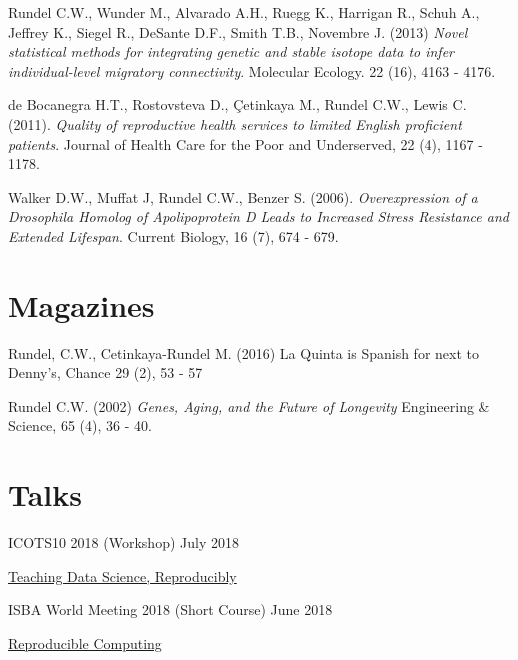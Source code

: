 \documentclass[margin,line]{res}
\begin{document}
\begin{resume}
\vspace{-0.15cm}
Rundel C.W., Wunder M., Alvarado A.H., Ruegg K., Harrigan R., Schuh A., Jeffrey K., Siegel R., DeSante D.F., Smith T.B., Novembre J. (2013) {\em Novel statistical methods for integrating genetic and stable isotope data to infer individual-level migratory connectivity}. Molecular Ecology. 22 (16), 4163 - 4176.

\vspace{-0.15cm}
de Bocanegra H.T., Rostovsteva D., \c{C}etinkaya M., Rundel C.W., Lewis C. (2011). {\em Quality of reproductive health services to limited English proficient patients}. Journal of Health Care for the Poor and Underserved, 22 (4), 1167 - 1178.

\vspace{-0.15cm}
Walker D.W., Muffat J, Rundel C.W., Benzer S. (2006). {\em Overexpression of a Drosophila Homolog of Apolipoprotein D Leads to Increased Stress Resistance and Extended Lifespan}. Current Biology, 16 (7), 674 - 679.


\vspace{4mm}

%

\section{\sc Magazines}

Rundel, C.W., Cetinkaya-Rundel M. (2016) La Quinta is Spanish for next to Denny's, Chance 29 (2), 53 - 57


Rundel C.W. (2002) {\em Genes, Aging, and the Future of Longevity} Engineering \& Science, 65 (4), 36 - 40.

\vspace{4mm}

%

\section{\sc Talks}

ICOTS10 2018 (Workshop) \hfill July 2018
\begin{list1}
\item[] \href{https://mine-cetinkaya-rundel.github.io/teach-data-sci-icots2018/}{Teaching Data Science, Reproducibly}
\end{list1}
\vspace{-2mm}

ISBA World Meeting 2018 (Short Course) \hfill June 2018
\begin{list1}
\item[] \href{https://mine-cetinkaya-rundel.github.io/repro-compute-isba18/}{Reproducible Computing}
\end{list1}
\vspace{-2mm}


\end{resume}
\end{document}

